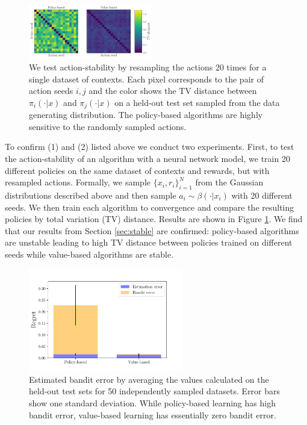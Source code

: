 \begin{figure}[h]
    \centering
    \includegraphics[width=0.48\textwidth]{figures/offline-bandits/toy_stability.pdf}
    \caption{We test action-stability by resampling the actions 20 times for a single dataset of contexts. Each pixel corresponds to the pair of action seeds $ i,j $ and the color shows the TV distance between $ \pi_i(\cdot|x)$ and $ \pi_j(\cdot|x) $ on a held-out test set sampled from the data generating distribution. The policy-based algorithms are highly sensitive to the randomly sampled actions.}
    \label{fig:toy_stability}
\end{figure}


To confirm (1) and (2) listed above we conduct two experiments. First, to test the action-stability of an algorithm with a neural network model, we train 20 different policies on the same dataset of contexts and rewards, but with resampled actions. Formally, we sample $ \{x_i, r_i\}_{i=1}^N$ from the Gaussian distributions described above and then sample $ a_i \sim \beta(\cdot|x_i)$ with 20 different seeds. We then train each algorithm to convergence and compare the resulting policies by total variation (TV) distance. Results are shown in Figure \ref{fig:toy_stability}. We find that our results from Section \ref{sec:stable} are confirmed: policy-based algorithms are unstable leading to high TV distance between policies trained on different seeds while value-based algorithms are stable.


\begin{figure}
    \centering
    \includegraphics[width=0.6\textwidth]{figures/offline-bandits/toy_regret_bar.pdf}
    \caption{Estimated bandit error by averaging the values calculated on the held-out test sets for 50 independently sampled datasets. Error bars show one standard deviation. While policy-based learning has high bandit error, value-based learning has essentially zero bandit error.}
    \label{fig:toy_regret}
\end{figure}



